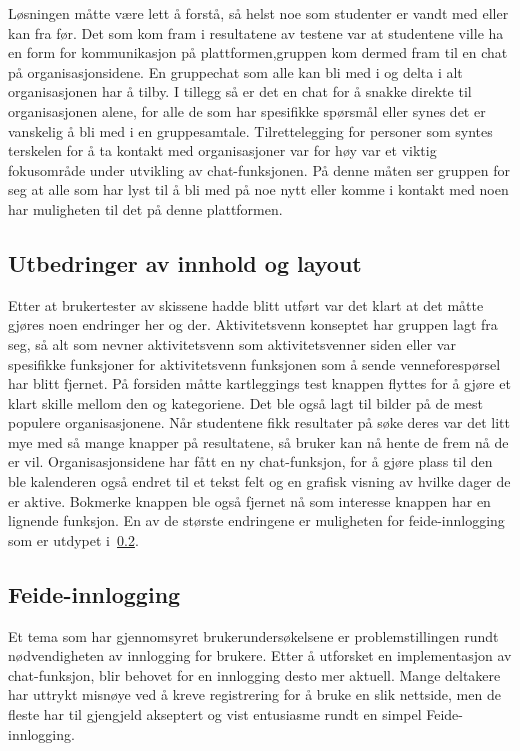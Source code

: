 Løsningen måtte være lett å forstå, så helst noe som studenter er vandt med eller kan fra før. Det som kom fram i resultatene av testene var at studentene ville ha en form for kommunikasjon på plattformen,gruppen kom dermed fram til en chat på organisasjonsidene. En gruppechat som alle kan bli med i og delta i alt organisasjonen har å tilby. I tillegg så er det en chat for å snakke direkte til organisasjonen alene, for alle de som har spesifikke spørsmål eller synes det er vanskelig å bli med i en gruppesamtale. Tilrettelegging for personer som syntes terskelen for å ta kontakt med organisasjoner var for høy var et viktig fokusområde under utvikling av chat-funksjonen. På denne måten ser gruppen for seg at alle som har lyst til å bli med på noe nytt eller komme i kontakt med noen har muligheten til det på denne plattformen.

\subsection{Utbedringer av innhold og layout}
Etter at brukertester av skissene hadde blitt utført var det klart at det måtte gjøres noen endringer her og der. Aktivitetsvenn konseptet har gruppen lagt fra seg, så alt som nevner aktivitetsvenn som aktivitetsvenner siden eller var spesifikke funksjoner for aktivitetsvenn funksjonen som å sende venneforespørsel har blitt fjernet. På forsiden måtte kartleggings test knappen flyttes for å gjøre et klart skille mellom den og kategoriene. Det ble også lagt til bilder på de mest populere organisasjonene. Når studentene fikk resultater på søke deres var det litt mye med så mange knapper på resultatene, så bruker kan nå hente de frem nå de er vil. Organisasjonsidene har fått en ny chat-funksjon, for å gjøre plass til den ble kalenderen også endret til et tekst felt og en grafisk visning av hvilke dager de er aktive. Bokmerke knappen ble også fjernet nå som interesse knappen har en lignende funksjon. En av de største endringene er muligheten for feide-innlogging som er utdypet i~\ref{section:feide}. 


\subsection{Feide-innlogging}
\label{section:feide}
Et tema som har gjennomsyret brukerundersøkelsene er problemstillingen rundt nødvendigheten av innlogging for brukere. Etter å utforsket en implementasjon av chat-funksjon, blir behovet for en innlogging desto mer aktuell. Mange deltakere har uttrykt misnøye ved å kreve registrering for å bruke en slik nettside, men de fleste har til gjengjeld akseptert og vist entusiasme rundt en simpel Feide-innlogging.

